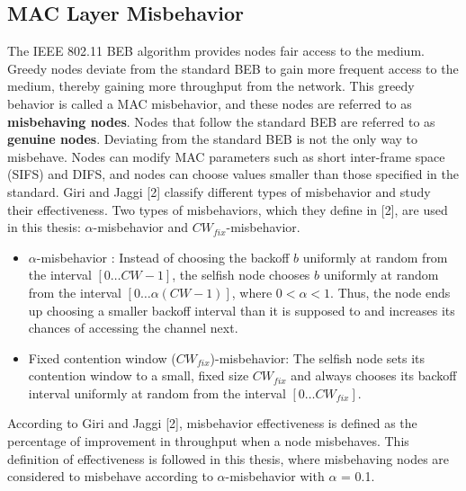 \documentclass[12pt,letterpaper,english]{article}
\begin{document}
\subsection{MAC Layer Misbehavior}
\label{subsection:maclayermisbehavior}
\indent The IEEE 802.11 BEB algorithm provides nodes fair access to the medium. 
Greedy nodes deviate from the standard BEB to gain more frequent access to the medium, thereby gaining more throughput from the network. 
This greedy behavior is called a MAC misbehavior, and these nodes are referred to as \textbf{misbehaving nodes}. 
Nodes that follow the standard BEB are referred to as \textbf{genuine nodes}. 
Deviating from the standard BEB is not the only way to misbehave. Nodes can modify MAC parameters such as short inter-frame space (SIFS) and DIFS, and nodes can choose values smaller than those specified in the standard. 
Giri and Jaggi 
[2] 
classify different types of misbehavior and study their effectiveness. 
Two types of misbehaviors, which they define in 
[2], 
are used in this thesis: $\alpha$-misbehavior and $CW_{fix}$-misbehavior.
\begin {itemize}
\item{{$\alpha$-misbehavior} :
Instead of choosing the backoff $b$ uniformly at random from the interval $[0 \ldots CW - 1]$, the selfish node chooses $b$ uniformly at random from the interval $[0 \ldots \alpha (CW - 1)]$, where $0 < \alpha < 1$.
Thus, the node ends up choosing a smaller backoff interval than it is supposed to and increases its chances of accessing the channel next.
}
\item{ {Fixed contention window ($CW_{fix}$)-misbehavior}:
The selfish node sets its contention window to a small, fixed size $CW_{fix}$ and always chooses its backoff interval uniformly at random
from the interval $[0 \ldots CW_{fix}]$. 
}
\end{itemize}
According to Giri and Jaggi 
[2], 
misbehavior effectiveness is defined as the percentage of improvement in throughput when a node misbehaves. This definition of effectiveness is followed in this thesis, where misbehaving nodes are considered to misbehave according to $\alpha$-misbehavior with $\alpha$ = 0.1.  
\end{document}
